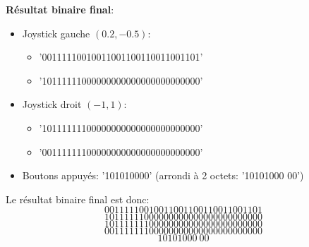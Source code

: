 \documentclass{article}
\begin{document}
\textbf{Résultat binaire final}:
\begin{itemize}
  \item Joystick gauche $(0.2, -0.5)$:
  \begin{itemize}
    \item '00111110010011001100110011001101'
    \item '10111111000000000000000000000000'
  \end{itemize}
  \item Joystick droit $(-1, 1)$:
  \begin{itemize}
    \item '10111111100000000000000000000000'
    \item '00111111100000000000000000000000'
  \end{itemize}
  \item Boutons appuyés: '101010000' (arrondi à 2 octets: '10101000 00')
\end{itemize}

Le résultat binaire final est donc:
\[
00111110010011001100110011001101
\]
\[10111111000000000000000000000000\]
\[10111111100000000000000000000000\]
\[00111111100000000000000000000000\]
\[10101000 \ 00\]
\end{document}
